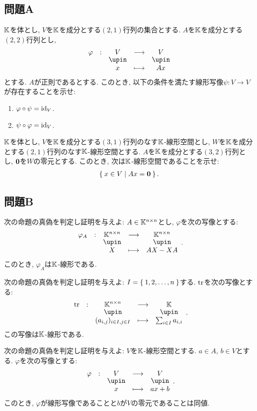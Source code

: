 \subsection{問題A}
\begin{quiz}
  $\mathbb{K}$を体とし, $V$を$\mathbb{K}$を成分とする$(2,1)$行列の集合とする.
  $A$を$\mathbb{K}$を成分とする$(2,2)$行列とし,
  \begin{align*}
    \shazo{\varphi}{V}{V}{x}{Ax}
  \end{align*}
  とする. $A$が正則であるとする.
  このとき, 以下の条件を満たす線形写像$\psi\colon V\to V$が存在することを示せ:
  \begin{enumerate}
    \item $\varphi\circ \psi=\operatorname{id}_V$.
    \item $\psi\circ \varphi=\operatorname{id}_V$.
  \end{enumerate}
\end{quiz}
\begin{quiz}
  $\mathbb{K}$を体とし,
  $V$を$\mathbb{K}$を成分とする$(3,1)$行列のなす$\mathbb{K}$-線形空間とし,
  $W$を$\mathbb{K}$を成分とする$(2,1)$行列のなす$\mathbb{K}$-線形空間とする.
  $A$を$\mathbb{K}$を成分とする$(3,2)$行列とし,
  $\boldsymbol{0}$を$W$の零元とする.
  このとき, 次は$\mathbb{K}$-線形空間であることを示せ:
  \begin{align*}
    \Set{x\in V|Ax=\boldsymbol{0}}.
  \end{align*}
\end{quiz}

\subsection{問題B}
\begin{quiz}
  次の命題の真偽を判定し証明を与えよ:
  $A\in \mathbb{K}^{n\times n}$とし,
  $\varphi$を次の写像とする:
  \begin{align*}
    \shazo{\varphi_A}{\KK^{n\times n}}{\KK^{n\times n}}{X}{AX-XA}.
  \end{align*}
  このとき, $\varphi_A$は$\mathbb{K}$-線形である.
\end{quiz}

\begin{quiz}
  次の命題の真偽を判定し証明を与えよ:
  $I=\Set{1,2,\ldots, n}$する.
  $\operatorname{tr}$を次の写像とする:
  \begin{align*}
    \shazo{\tr}{\KK^{n\times n}}{\KK}{(a_{i,j})_{i\in I, j\in I}}{\sum_{i\in I}a_{i,i}}.
  \end{align*}
  この写像は$\mathbb{K}$-線形である.
\end{quiz}


\begin{quiz}
  次の命題の真偽を判定し証明を与えよ:
  $V$を$\mathbb{K}$-線形空間とする.
  $a\in A$, $b\in V$とする.
  $\varphi$を次の写像とする:
  \begin{align*}
    \shazo{\varphi}{V}{V}{x}{ax+b}.
  \end{align*}
  このとき,
  $\varphi$が線形写像であることと$b$が$V$の零元であることは同値.
\end{quiz}

